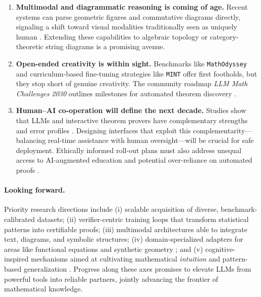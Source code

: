 \documentclass[acmsmall,anonymous]{acmart}
\begin{document}
\begin{enumerate}
    \item \textbf{Multimodal and diagrammatic reasoning is coming of age.}  Recent systems can parse geometric figures and commutative diagrams directly, signaling a shift toward visual modalities traditionally seen as uniquely human \cite{zhang2024diagramformalization}.  Extending these capabilities to algebraic topology or category-theoretic string diagrams is a promising avenue.

    \item \textbf{Open-ended creativity is within sight.}  Benchmarks like \texttt{MathOdyssey} \cite{zhang2024mathodyssey} and curriculum-based fine-tuning strategies like \texttt{MINT} \cite{li2024mint} offer first footholds, but they stop short of genuine creativity.  The community roadmap \emph{LLM Math Challenges 2030} outlines milestones for automated theorem discovery \cite{llm-math-challenges2024}.

    \item \textbf{Human–AI co-operation will define the next decade.}  Studies show that LLMs and interactive theorem provers have complementary strengths and error profiles \cite{johnson2024llmvsitp,yang2023leandojo}.  Designing interfaces that exploit this complementarity—balancing real-time assistance with human oversight—will be crucial for safe deployment.  Ethically informed roll-out plans must also address unequal access to AI-augmented education and potential over-reliance on automated proofs \cite{buzzard2019future,ahn2024largelanguagemodels}.
\end{enumerate}

\paragraph{Looking forward.}
Priority research directions include (i) scalable acquisition of diverse, benchmark-calibrated datasets; (ii) verifier-centric training loops that transform statistical patterns into certifiable proofs; (iii) multimodal architectures able to integrate text, diagrams, and symbolic structures; (iv) domain-specialized adapters for areas like functional equations \cite{buali2024towards} and synthetic geometry \cite{sinha2024wusmethod}; and (v) cognitive-inspired mechanisms aimed at cultivating mathematical \emph{intuition} and pattern-based generalization \cite{li2024mindstar}.  Progress along these axes promises to elevate LLMs from powerful tools into reliable partners, jointly advancing the frontier of mathematical knowledge.
\end{document}
